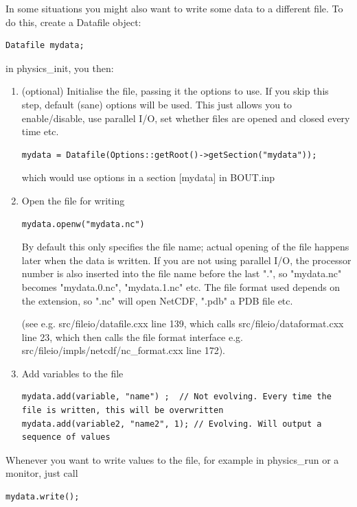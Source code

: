 \documentclass[12pt]{article}
\begin{document}
In some situations you might also want to write some data to a different file. To do this,
create a Datafile object: 

\begin{lstlisting}
Datafile mydata;
\end{lstlisting}

in physics\_init, you then:

\begin{enumerate}
\item (optional) Initialise the file, passing it the options to use. If you skip this step, default (sane) options will be used. This just allows you to enable/disable, use parallel I/O, set whether files are opened and closed every time etc.
\begin{lstlisting}
mydata = Datafile(Options::getRoot()->getSection("mydata"));
\end{lstlisting}
which would use options in a section [mydata] in BOUT.inp

\item Open the file for writing
\begin{lstlisting}
mydata.openw("mydata.nc")
\end{lstlisting}
By default this only specifies the file name; actual opening of the file happens later when the data is written. If you are not using parallel I/O, the processor number is also inserted into the file name before the last ".", so "mydata.nc" becomes "mydata.0.nc", "mydata.1.nc" etc. The file format used depends on the extension, so ".nc" will open NetCDF, ".pdb" a PDB file etc.

(see e.g. src/fileio/datafile.cxx line 139, which calls src/fileio/dataformat.cxx line 23, which then calls the file format interface e.g. src/fileio/impls/netcdf/nc\_format.cxx line 172).

\item Add variables to the file
\begin{lstlisting}
mydata.add(variable, "name") ;  // Not evolving. Every time the file is written, this will be overwritten
mydata.add(variable2, "name2", 1); // Evolving. Will output a sequence of values
\end{lstlisting}
\end{enumerate}

Whenever you want to write values to the file, for example in physics\_run or a monitor, just call
\begin{lstlisting}
mydata.write();
\end{lstlisting}
\end{document}
